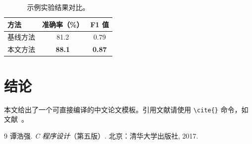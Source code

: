 \documentclass[zihao=-4, a4paper]{ctexart}
\begin{document}
\begin{table}[htbp]
  \centering
  \caption{示例实验结果对比。}
  \label{tab:result}
  \begin{tabular}{lcc}
    \toprule
    方法 & 准确率（\%） & F1 值 \\
    \midrule
    基线方法   & 81.2 & 0.79 \\
    本文方法   & \textbf{88.1} & \textbf{0.87} \\
    \bottomrule
  \end{tabular}
\end{table}

\section{结论}
本文给出了一个可直接编译的中文论文模板。引用文献请使用
\verb|\cite{}| 命令，如文献~\cite{tan2018}。

\begin{thebibliography}{9}
谭浩强.
\newblock \emph{C 程序设计}（第五版）.
\newblock 北京：清华大学出版社, 2017.
\end{thebibliography}
\end{document}
